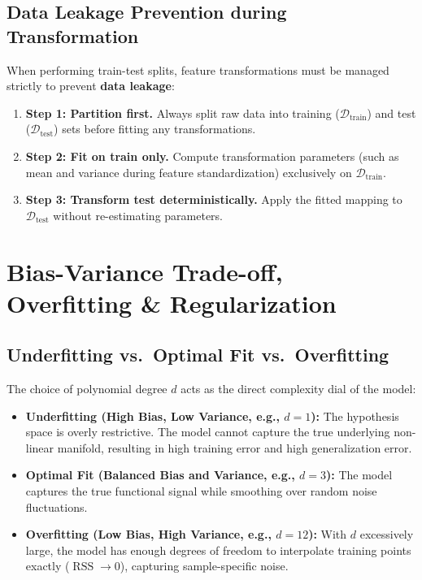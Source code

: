 \documentclass[11pt,a4paper]{article}
\numberwithin{equation}{section}
\newcommand{\RSS}{\operatorname{RSS}}
\begin{document}
\subsection{Data Leakage Prevention during Transformation}
When performing train-test splits, feature transformations must be managed strictly to prevent \textbf{data leakage}:
\begin{enumerate}
  \item \textbf{Step 1: Partition first.} Always split raw data into training ($\mathcal{D}_{\text{train}}$) and test ($\mathcal{D}_{\text{test}}$) sets before fitting any transformations.
  \item \textbf{Step 2: Fit on train only.} Compute transformation parameters (such as mean and variance during feature standardization) exclusively on $\mathcal{D}_{\text{train}}$.
  \item \textbf{Step 3: Transform test deterministically.} Apply the fitted mapping to $\mathcal{D}_{\text{test}}$ without re-estimating parameters.
\end{enumerate}


\section{Bias-Variance Trade-off, Overfitting \& Regularization}

\subsection{Underfitting vs.\ Optimal Fit vs.\ Overfitting}
The choice of polynomial degree $d$ acts as the direct complexity dial of the model:
\begin{itemize}
  \item \textbf{Underfitting (High Bias, Low Variance, e.g., $d=1$):} The hypothesis space is overly restrictive. The model cannot capture the true underlying non-linear manifold, resulting in high training error and high generalization error.
  \item \textbf{Optimal Fit (Balanced Bias and Variance, e.g., $d=3$):} The model captures the true functional signal while smoothing over random noise fluctuations.
  \item \textbf{Overfitting (Low Bias, High Variance, e.g., $d=12$):} With $d$ excessively large, the model has enough degrees of freedom to interpolate training points exactly ($\RSS \to 0$), capturing sample-specific noise.
\end{itemize}
\end{document}
